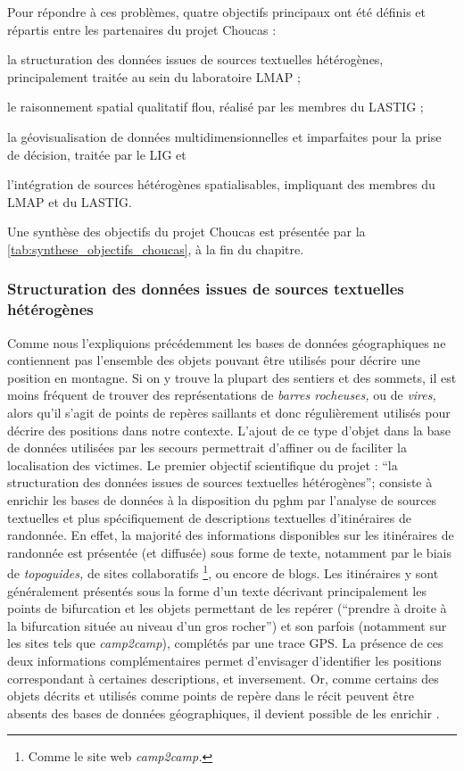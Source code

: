 Pour répondre à ces problèmes, quatre objectifs principaux ont été
définis et répartis entre les partenaires du projet Choucas :%
%
\begin{enumerate*}[label=(\arabic*)]
\item la structuration des données issues de sources textuelles
  hétérogènes, principalement traitée au sein du laboratoire LMAP ;
\item le raisonnement spatial qualitatif flou, réalisé par les membres
  du LASTIG ;
\item la géovisualisation de données multidimensionnelles et
  imparfaites pour la prise de décision, traitée par le LIG et
\item l'intégration de sources hétérogènes spatialisables, impliquant
  des membres du LMAP et du LASTIG.
\end{enumerate*}
%
Une synthèse des objectifs du projet Choucas est présentée par la
\autoref{tab:synthese_objectifs_choucas}, à la fin du chapitre.

\subsubsection{Structuration des données issues de sources textuelles
  hétérogènes}
\label{subsec:1-2-3-1}

Comme nous l’expliquions précédemment les bases de données
géographiques ne contiennent pas l'ensemble des objets pouvant être
utilisés pour décrire une position en montagne. Si on y trouve la
plupart des sentiers et des sommets, il est moins fréquent de trouver
des représentations de \emph{barres rocheuses,} ou de \emph{vires,}
alors qu'il s'agit de points de repères saillants et donc
régulièrement utilisés pour décrire des positions dans notre
contexte. L'ajout de ce type d'objet dans la base de données utilisées
par les secours permettrait d’affiner ou de faciliter la localisation
des victimes. Le premier objectif scientifique du projet : \enquote{la
  structuration des données issues de sources textuelles hétérogènes};
consiste à enrichir les bases de données à la disposition du \ac{pghm}
par l'analyse de sources textuelles et plus spécifiquement de
descriptions textuelles d'itinéraires de randonnée. En effet, la
majorité des informations disponibles sur les itinéraires de randonnée
est présentée (et diffusée) sous forme de texte, notamment par le
biais de \emph{topoguides,} de sites collaboratifs \footnote{Comme le
  site web \emph{camp2camp.}}, ou encore de blogs. Les itinéraires y
sont généralement présentés sous la forme d'un texte décrivant
principalement les points de bifurcation et les objets permettant de
les repérer (\eg \enquote{prendre à droite à la bifurcation située au
  niveau d'un gros rocher}) et son parfois (notamment sur les sites
tels que \emph{camp2camp}), complétés par une trace GPS. La présence
de ces deux informations complémentaires permet d'envisager
d'identifier les positions correspondant à certaines descriptions, et
inversement. Or, comme certains des objets décrits et utilisés comme
points de repère dans le récit peuvent être absents des bases de
données géographiques, il devient possible de les enrichir
\autocite{Moncla2019,Medad2018}.

